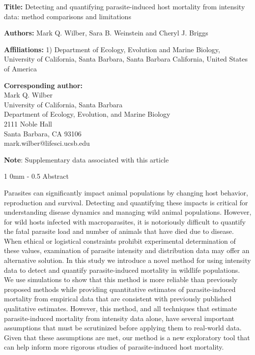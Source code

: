\documentclass[12pt, a4paper]{article}
\makeatletter
\renewcommand{\section}{\@startsection
{section}%
{1}%
{0mm}%
{-\baselineskip}%
{0.5\baselineskip}%
{\normalfont\bf\large}} %
\makeatother
\begin{document}
\linenumbers

\noindent
\textbf{Title:} Detecting and quantifying parasite-induced host mortality from intensity data: method comparisons and limitations

\bigskip
\noindent
\textbf{Authors:} Mark Q. Wilber, Sara B. Weinstein and Cheryl J. Briggs

\bigskip
\noindent
\textbf{Affiliations:} 1) Department of Ecology, Evolution and Marine Biology, University of California,
Santa Barbara, Santa Barbara California, United States of America

\bigskip
\noindent
\textbf{Corresponding author:}\\Mark Q. Wilber\\University of California, Santa Barbara\\
Department of Ecology, Evolution, and Marine Biology\\
2111 Noble Hall\\
Santa Barbara, CA 93106\\
mark.wilber@lifesci.ucsb.edu


\bigskip\noindent
\textbf{Note}: Supplementary data associated with this article

\newpage

\doublespacing

\section{Abstract}

Parasites can significantly impact animal populations by changing host
behavior, reproduction and survival. Detecting and quantifying these impacts is
critical for understanding disease dynamics and managing wild animal
populations. However, for wild hosts infected with macroparasites, it is
notoriously difficult to quantify the fatal parasite load and number of animals
that have died due to disease. When ethical or logistical constraints prohibit
experimental determination of these values, examination of parasite intensity
and distribution data may offer an alternative solution. In this study we
introduce a novel method for using intensity data to detect and quantify
parasite-induced mortality in wildlife populations. We use simulations to show
that this method is more reliable than previously proposed methods while
providing quantitative estimates of parasite-induced mortality from empirical
data that are consistent with previously published qualitative estimates.
However, this method, and all techniques that estimate parasite-induced
mortality from intensity data alone, have several important assumptions that
must be scrutinized before applying them to real-world data. Given that these
assumptions are met, our method is a new exploratory tool that can help inform
more rigorous studies of parasite-induced host mortality.
\end{document}
